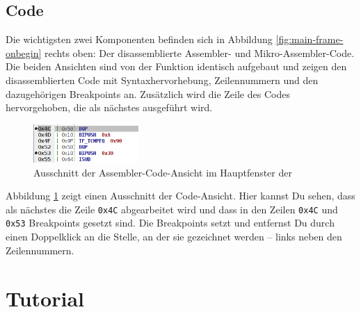 \subsection{Code}
Die wichtigsten zwei Komponenten befinden sich in Abbildung \ref{fig:main-frame-onbegin} rechts oben: Der disassemblierte Assembler- und Mikro-Assembler-Code. Die beiden Ansichten sind von der Funktion identisch aufgebaut und zeigen den disassemblierten Code mit Syntaxhervorhebung, Zeilennummern und den dazugehörigen Breakpoints an. Zusätzlich wird die Zeile des Codes hervorgehoben, die als nächstes ausgeführt wird.

\begin{figure}[h]
	\centering
	\includegraphics[width=4cm]{images/main-frame-code-part}
	\caption{Ausschnitt der Assembler-Code-Ansicht im Hauptfenster der \mdg{}}
	\label{fig:main-frame-code-part}
\end{figure}

Abbildung \ref{fig:main-frame-code-part} zeigt einen Ausschnitt der Code-Ansicht. Hier kannst Du sehen, dass als nächstes die Zeile \texttt{0x4C} abgearbeitet wird und dass in den Zeilen \texttt{0x4C} und \texttt{0x53} Breakpoints gesetzt sind. Die Breakpoints setzt und entfernst Du durch einen Doppelklick an die Stelle, an der sie gezeichnet werden -- links neben den Zeilennummern.


\section{Tutorial}